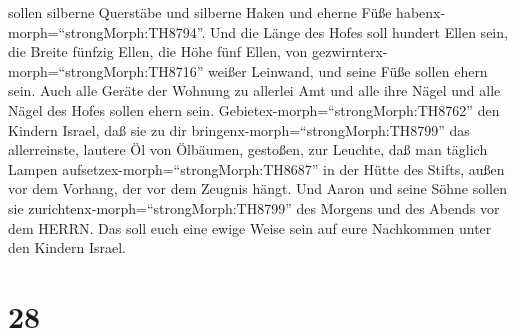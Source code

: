 sollen silberne Querstäbe und silberne Haken und eherne Füße
habenx-morph=``strongMorph:TH8794''.  Und die Länge des
Hofes soll hundert Ellen sein, die Breite fünfzig Ellen, die Höhe fünf
Ellen, von gezwirnterx-morph=``strongMorph:TH8716'' weißer Leinwand, und
seine Füße sollen ehern sein.  Auch alle Geräte der Wohnung
zu allerlei Amt und alle ihre Nägel und alle Nägel des Hofes sollen
ehern sein.  Gebietex-morph=``strongMorph:TH8762'' den
Kindern Israel, daß sie zu dir bringenx-morph=``strongMorph:TH8799'' das
allerreinste, lautere Öl von Ölbäumen, gestoßen, zur Leuchte, daß man
täglich Lampen aufsetzex-morph=``strongMorph:TH8687''  in
der Hütte des Stifts, außen vor dem Vorhang, der vor dem Zeugnis hängt.
Und Aaron und seine Söhne sollen sie
zurichtenx-morph=``strongMorph:TH8799'' des Morgens und des Abends vor
dem HERRN. Das soll euch eine ewige Weise sein auf eure Nachkommen unter
den Kindern Israel.

\hypertarget{section-27}{%
\section{28}\label{section-27}}

